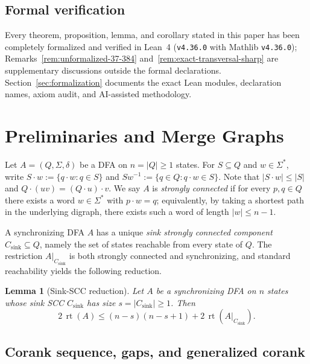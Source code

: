 \documentclass[11pt]{article}
\newtheorem{lemma}[theorem]{Lemma}
\theoremstyle{definition}
\theoremstyle{remark}
\newcommand{\rt}{\operatorname{rt}}
\begin{document}
\subsection{Formal verification}

Every theorem, proposition, lemma, and corollary stated in this paper has been completely formalized and verified in Lean~4 (\texttt{v4.36.0} with Mathlib \texttt{v4.36.0}); Remarks~\ref{rem:unformalized-37-384} and~\ref{rem:exact-transversal-sharp} are supplementary discussions outside the formal declarations. Section~\ref{sec:formalization} documents the exact Lean modules, declaration names, axiom audit, and AI-assisted methodology.

\section{Preliminaries and Merge Graphs}\label{sec:prelim}

Let $A = (Q, \Sigma, \delta)$ be a DFA on $n = |Q| \ge 1$ states. For $S \subseteq Q$ and $w \in \Sigma^*$, write $S \cdot w := \{q \cdot w : q \in S\}$ and $S w^{-1} := \{q \in Q : q \cdot w \in S\}$. Note that $|S \cdot w| \le |S|$ and $Q \cdot (uv) = (Q \cdot u) \cdot v$. We say $A$ is \emph{strongly connected} if for every $p, q \in Q$ there exists a word $w \in \Sigma^*$ with $p \cdot w = q$; equivalently, by taking a shortest path in the underlying digraph, there exists such a word of length $|w| \le n - 1$.

A synchronizing DFA $A$ has a unique \emph{sink strongly connected component} $C_{\mathrm{sink}} \subseteq Q$, namely the set of states reachable from every state of $Q$. The restriction $A|_{C_{\mathrm{sink}}}$ is both strongly connected and synchronizing, and standard reachability yields the following reduction.

\begin{lemma}[Sink-SCC reduction]\label{lem:scc-reduction}
Let $A$ be a synchronizing DFA on $n$ states whose sink SCC $C_{\mathrm{sink}}$ has size $s = |C_{\mathrm{sink}}| \ge 1$. Then
\[
  2\, \rt(A) \le (n - s)(n - s + 1) + 2\, \rt(A|_{C_{\mathrm{sink}}}).
\]
\end{lemma}

\subsection{Corank sequence, gaps, and generalized corank}
\end{document}
